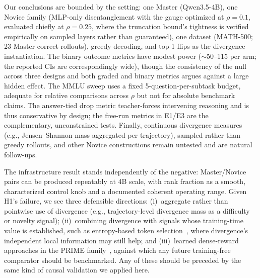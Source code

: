 \documentclass[times, 10pt,twocolumn]{article}
\begin{document}
Our conclusions are bounded by the setting: one Master (Qwen3.5-4B), one
Novice family (MLP-only disentanglement with the gauge optimized at
$\rho{=}0.1$, evaluated chiefly at $\rho{=}0.25$, where the truncation
bound's tightness is verified empirically on sampled layers rather than
guaranteed), one dataset (MATH-500; 23 Master-correct rollouts), greedy
decoding, and top-1 flips as the divergence instantiation. The binary outcome metrics have
modest power ($\sim$50--115 per arm; the reported CIs are correspondingly
wide), though the consistency of the null across three designs and both graded
and binary metrics argues against a large hidden effect. The MMLU sweep uses a
fixed 5-question-per-subtask budget, adequate for relative comparisons across
$\rho$ but not for absolute benchmark claims. The answer-tied drop metric
teacher-forces intervening reasoning and is thus conservative by design; the
free-run metrics in E1/E3 are the complementary, unconstrained tests. Finally,
continuous divergence measures (e.g., Jensen--Shannon mass aggregated per
trajectory), sampled rather than greedy rollouts, and other Novice
constructions remain untested and are natural follow-ups.


The infrastructure result stands independently of the negative: Master/Novice
pairs can be produced repeatably at 4B scale, with rank fraction as a smooth,
characterized control knob and a documented coherent operating range. Given
H1's failure, we see three defensible directions: (i)~aggregate rather than
pointwise use of divergence (e.g., trajectory-level divergence mass as a
difficulty or novelty signal); (ii)~combining divergence with signals whose
training-time value is established, such as entropy-based token
selection~\cite{wang2025forking}, where divergence's independent local
information may still help; and (iii)~learned dense-reward approaches in the
PRIME family~\cite{cui2025prime}, against which any future training-free
comparator should be benchmarked. Any of these should be preceded by the same
kind of causal validation we applied here.


\end{document}
